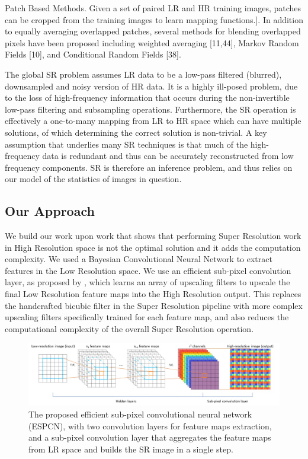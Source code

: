 Patch Based Methods. Given a set of paired LR and HR training images,
patches can be cropped from the training images to learn mapping functions.]. In addition to equally averaging overlapped patches, several methods for blending overlapped pixels have been proposed including weighted averaging [11,44], Markov Random Fields [10], and Conditional Random Fields [38].



The global \ac{SR} problem assumes \ac{LR} data to be a low-pass filtered (blurred), downsampled and noisy version of \ac{HR} data. It is a highly ill-posed problem, due to the loss of high-frequency information that occurs during the non-invertible low-pass filtering and subsampling operations. Furthermore, the SR operation is effectively a one-to-many mapping from \ac{LR} to \ac{HR} space which can have multiple solutions, of which determining the correct solution is non-trivial. A key assumption that underlies many \ac{SR} techniques is that much of the high-frequency data is redundant and thus can be accurately reconstructed from low frequency components. \ac{SR} is therefore an inference problem, and thus relies on our model of the statistics of images in question.


\subsection{Our Approach}

We build our work upon \citet{DBLP:journals/corr/ShiCHTABRW16} work that shows that performing Super Resolution work in High Resolution space is not the optimal solution and it adds the computation complexity. We used a Bayesian Convolutional Neural Network to extract features in the Low Resolution space. We use an efficient sub-pixel convolution layer, as proposed by \citet{DBLP:journals/corr/ShiCHTABRW16}, which learns an array of upscaling filters to upscale the final Low Resolution feature maps into the High Resolution output. This replaces the handcrafted bicubic filter in the Super Resolution pipeline with more complex upscaling filters specifically trained for each feature map, and also reduces the computational complexity of the overall Super Resolution operation.

\begin{figure}[htbp]
\begin{center}
\includegraphics[width=1.0\linewidth]{Chapter6/Figs/networkstructure.jpg}
\caption{The proposed efficient sub-pixel convolutional neural network (ESPCN), with two convolution layers for feature maps extraction, and a sub-pixel convolution layer that aggregates the feature maps from \ac{LR} space and builds the \ac{SR} image in a single step.}
\label{fig:networkstructure}
\end{center}
\end{figure}

